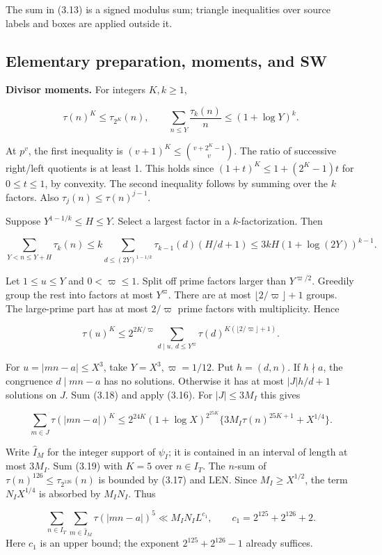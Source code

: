 The sum in (3.13) is a signed modulus sum; triangle inequalities over
source labels and boxes are applied outside it.

\subsection{Elementary preparation, moments, and SW}\label{sec:pi-sw}

\textbf{Divisor moments.} For integers $K,k\ge1$,

\[
\tau(n)^K\le\tau_{2^K}(n),\qquad
\sum_{n\le Y}\frac{\tau_k(n)}n\le(1+\log Y)^k.
\tag{3.16}
\]

At $p^v$, the first inequality is
$(v+1)^K\le\binom{v+2^K-1}{v}$.
The ratio of successive right/left quotients is at least 1.
This holds since $(1+t)^K\le1+(2^K-1)t$ for $0\le t\le1$, by convexity.
The second inequality follows by summing over the $k$ factors. Also
$\tau_j(n)\le\tau(n)^{j-1}$.

Suppose $Y^{1-1/k}\le H\le Y$. Select a largest factor in a
$k$-factorization. Then

\[
\sum_{Y<n\le Y+H}\tau_k(n)
 \le k\sum_{d\le(2Y)^{1-1/k}}\tau_{k-1}(d)(H/d+1)
 \le3kH(1+\log(2Y))^{k-1}.
\tag{3.17}
\]

Let $1\le u\le Y$ and $0<\varpi\le1$.
Split off prime factors larger than $Y^{\varpi/2}$.
Greedily group the rest into factors at most $Y^\varpi$.
There are at most $\lfloor2/\varpi\rfloor+1$ groups.
The large-prime part has at most $2/\varpi$ prime factors with multiplicity. Hence

\[
\tau(u)^K\le2^{2K/\varpi}
 \sum_{d\mid u,\ d\le Y^\varpi}
       \tau(d)^{K(\lfloor2/\varpi\rfloor+1)}.
\tag{3.18}
\]

For $u=|mn-a|\le X^3$, take $Y=X^3,\varpi=1/12$.
Put $h=(d,n)$. If $h\nmid a$, the congruence $d\mid mn-a$ has no solutions.
Otherwise it has at most $|J|h/d+1$ solutions on $J$.
Sum (3.18) and apply (3.16). For $|J|\le3M_I$ this gives

\[
\sum_{m\in J}\tau(|mn-a|)^K
 \le2^{24K}(1+\log X)^{2^{25K}}\{3M_I\tau(n)^{25K+1}+X^{1/4}\}.
\tag{3.19}
\]

Write $\widehat I_M$ for the integer support of $\psi_I$;
it is contained in an interval of length at most $3M_I$.
Sum (3.19) with $K=5$ over $n\in I_T$.
The $n$-sum of $\tau(n)^{126}\le\tau_{2^{126}}(n)$ is bounded by (3.17) and LEN.
Since $M_I\ge X^{1/2}$, the term $N_IX^{1/4}$ is absorbed by $M_IN_I$. Thus

\[
\sum_{n\in I_T}\sum_{m\in\widehat I_M}
                 \tau(|mn-a|)^5\ll M_IN_IL^{c_1},
\qquad c_1=2^{125}+2^{126}+2.
\tag{3.20}
\]
Here $c_1$ is an upper bound; the exponent $2^{125}+2^{126}-1$ already suffices.

